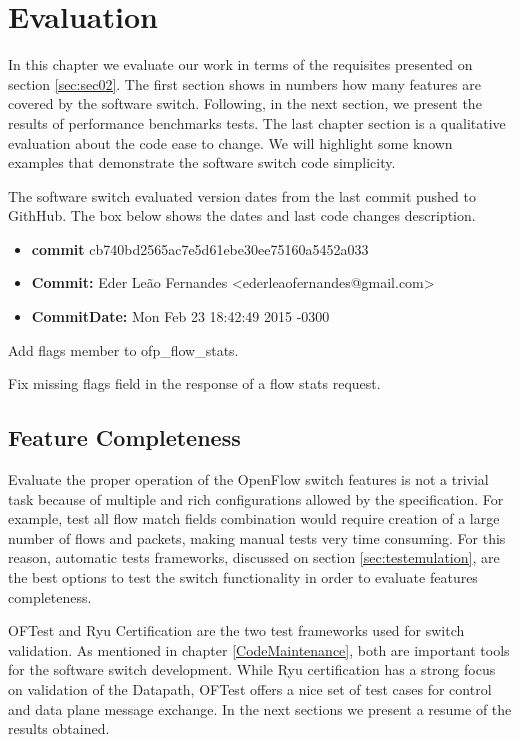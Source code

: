 \chapter{Evaluation}
\label{cap:cap05}

In this chapter we evaluate our work in terms of the requisites presented on section \ref{sec:sec02}. The first section shows in numbers how many features are covered by the software switch. Following, in the next section, we present the results of performance benchmarks tests. The last chapter section is a qualitative evaluation about the code ease to change. We will highlight some known examples that demonstrate the software switch code simplicity.      

The software switch evaluated version dates from the last commit pushed to GithHub. The box below shows the dates and last code changes description.

\begin{framed}

\begin{itemize}
\item \textbf{commit} cb740bd2565ac7e5d61ebe30ee75160a5452a033
\item   \textbf{Commit:}     Eder Leão Fernandes <ederleaofernandes@gmail.com> 
\item \textbf{CommitDate:} Mon Feb 23 18:42:49 2015 -0300 
\end{itemize}
     
    Add flags member to ofp_flow_stats.
    
    Fix missing flags field in the response of a flow stats request.
\end{framed}

\section{Feature Completeness}
\label{sec:FeatureComplete}
Evaluate the proper operation of the OpenFlow switch features is not a trivial task because of multiple and rich configurations allowed by the specification. For example, test all flow match fields combination would require creation of a large number of flows and packets, making manual tests very time consuming. For this reason, automatic tests frameworks, discussed on section \ref{sec:testemulation}, are the best options to test the switch functionality in order to evaluate features completeness.    

OFTest and Ryu Certification are the two test frameworks used for switch validation. As mentioned in chapter \ref{CodeMaintenance}, both are important tools for the software switch development. While Ryu certification has a strong focus on validation of the Datapath, OFTest offers a nice set of test cases for control and data plane message exchange. In the next sections we present a resume of the results obtained.  


